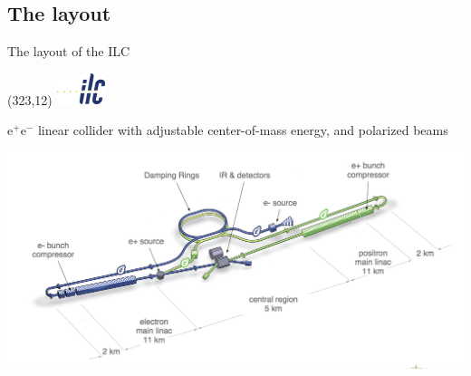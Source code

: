 \documentclass[xcolor={dvipsnames}]{beamer}
\newcommand{\ilclogo}{
  \setlength{\TPHorizModule}{1pt}
  \setlength{\TPVertModule}{1pt}
  \begin{textblock}{1}(323,12)
   \includegraphics[width=40pt,height=26pt]{figures/ILC.jpeg}
  \end{textblock}
}
\begin{document}
\subsection{The layout}
\begin{frame}{The layout of the ILC}
\ilclogo

e$^+$e$^-$ linear collider with adjustable center-of-mass energy, and polarized beams\\
\begin{center}
\includegraphics[width=\textwidth]{figures/ILC_schematic_layout.png}
\end{center}
\begin{flushright}
 \href{https://www.youtube.com/watch?v=ep5496vdEFI}{}
\end{flushright}

\end{frame}
\end{document}
